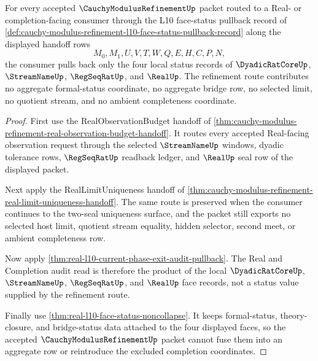 \begin{theorem}
\label{thm:cauchy-modulus-refinement-four-face-status-objectwise-pullback}
For every accepted $\CauchyModulusRefinementUp$ packet routed to a Real- or completion-facing consumer through the L10 face-status pullback record of \autoref{def:cauchy-modulus-refinement-l10-face-status-pullback-record} along the displayed handoff rows
$$
M_0,M_1,U,V,T,W,Q,E,H,C,P,N,
$$
the consumer pulls back only the four local status records of $\DyadicRatCoreUp$, $\StreamNameUp$, $\RegSeqRatUp$, and $\RealUp$. The refinement route contributes no aggregate formal-status coordinate, no aggregate bridge row, no selected limit, no quotient stream, and no ambient completeness coordinate.
\end{theorem}
\begin{proof}
First use the RealObservationBudget handoff of \autoref{thm:cauchy-modulus-refinement-real-observation-budget-handoff}. It routes every accepted Real-facing observation request through the selected $\StreamNameUp$ windows, dyadic tolerance rows, $\RegSeqRatUp$ readback ledger, and $\RealUp$ seal row of the displayed packet.

Next apply the RealLimitUniqueness handoff of \autoref{thm:cauchy-modulus-refinement-real-limit-uniqueness-handoff}. The same route is preserved when the consumer continues to the two-seal uniqueness surface, and the packet still exports no selected host limit, quotient stream equality, hidden selector, second meet, or ambient completeness row.

Now apply \autoref{thm:real-l10-current-phase-exit-audit-pullback}. The Real and Completion audit read is therefore the product of the local $\DyadicRatCoreUp$, $\StreamNameUp$, $\RegSeqRatUp$, and $\RealUp$ face records, not a status value supplied by the refinement route.

Finally use \autoref{thm:real-l10-face-status-noncollapse}. It keeps formal-status, theory-closure, and bridge-status data attached to the four displayed faces, so the accepted $\CauchyModulusRefinementUp$ packet cannot fuse them into an aggregate row or reintroduce the excluded completion coordinates.
\end{proof}

